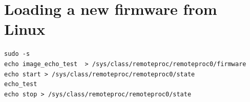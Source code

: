 \documentclass[10pt]{article}
\begin{document}
\section{Loading a new firmware from Linux}
\label{sec:loading-new-firmware}


\begin{tcolorbox}
\begin{verbatim}
sudo -s
echo image_echo_test  > /sys/class/remoteproc/remoteproc0/firmware
echo start > /sys/class/remoteproc/remoteproc0/state
echo_test
echo stop > /sys/class/remoteproc/remoteproc0/state
\end{verbatim}
\end{tcolorbox}
\end{document}
